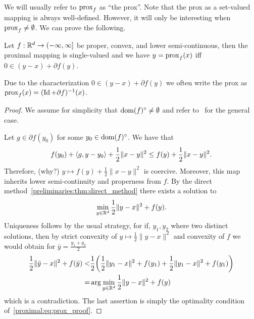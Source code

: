 We will usually refer to $\mathrm{prox}_f$ as \enquote{the prox}. Note that the prox as a set-valued mapping is always well-defined. However, it will only be interesting when $\mathrm{prox}_f\neq\emptyset$. We can prove the following.

\begin{lemma}
    Let $f:\mathbb{R}^d\rightarrow (-\infty,\infty]$ be proper, convex, and lower semi-continuous, then the proximal mapping is single-valued and we have $y = \mathrm{prox}_f(x)$ iff $0\in (y-x) + \partial f(y)$.
\end{lemma}
\begin{rem}
    Due to the characterization $0\in (y-x) + \partial f(y)$ we often write the prox as $\mathrm{prox}_f(x) = (\operatorname{\mathrm{Id}} + \partial f)^{-1}(x)$.
\end{rem}
\begin{proof}
    We assume for simplicity that $\operatorname{\mathrm{dom}}(f)^\circ\neq \emptyset$ and refer to~\cite{beck2017first} for the general case. 
    
    Let $g\in \partial f(y_0)$ for some $y_0\in \operatorname{\mathrm{dom}}(f)^\circ$. We have that 
    \begin{equation}
        f(y_0) + \left\langle g , y-y_0\right\rangle + \frac{1}{2}\|x-y\|^2\leq f(y) + \frac{1}{2}\|x-y\|^2.
    \end{equation}
    Therefore, (why?) $y\mapsto f(y) + \frac{1}{2}\|x-y\|^2$ is coercive. Moreover, this map inherits lower semi-continuity and properness from $f$. By the direct method~\cref{preliminaries:thm:direct_method} there exists a solution to 
    \begin{equation}\label{proximal:eq:prox_proof}
        \min_{y\in\mathbb{R}^d}\frac{1}{2}\|y - x\|^2 + f(y).
    \end{equation}
    Uniqueness follows by the usual strategy, for if, $y_1,y_2$ where two distinct solutions, then by strict convexity of $y\mapsto \frac{1}{2}\|y - x\|^2$ and convexity of $f$ we would obtain for $\bar{y} = \frac{y_1+y_2}{2}$
    \begin{equation}
        \begin{aligned}
            \frac{1}{2}\|\bar y - x\|^2 + f(\bar y)
            <& \frac{1}{2}\bigg(\frac{1}{2}\| y_1 - x\|^2 + f(y_1) + \frac{1}{2}\|y_1 - x\|^2 + f(y_1)\bigg)\\
            =&\arg\min_{y\in\mathbb{R}^d}\frac{1}{2}\|y - x\|^2 + f(y)
        \end{aligned}
    \end{equation}
    which is a contradiction. The last assertion is simply the optimality condition of~\eqref{proximal:eq:prox_proof}.
\end{proof}

